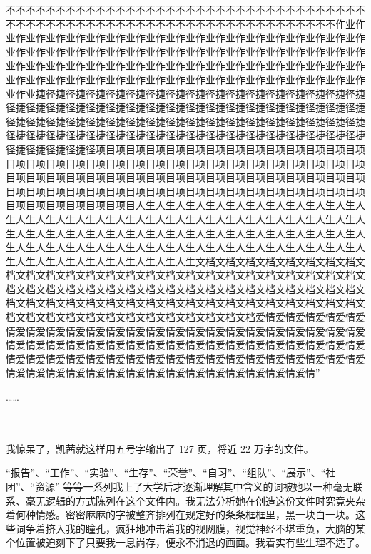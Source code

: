 \documentclass[UTF8]{ctexart}
\begin{document}
不不不不不不不不不不不不不不不不不不不不不不不不不不不不不不不不不不不不不不不不不不不不不不不不不不不不不不不不不不不不不不不不不不不不不作业作业作业作业作业作业作业作业作业作业作业作业作业作业作业作业作业作业作业作业作业作业作业作业作业作业作业作业作业作业作业作业作业作业作业作业作业作业作业作业作业作业作业作业作业作业作业作业作业作业作业作业作业作业作业作业作业作业作业作业作业作业作业作业作业作业作业作业作业作业作业作业作业作业作业捷径捷径捷径捷径捷径捷径捷径捷径捷径捷径捷径捷径捷径捷径捷径捷径捷径捷径捷径捷径捷径捷径捷径捷径捷径捷径捷径捷径捷径捷径捷径捷径捷径捷径捷径捷径捷径捷径捷径捷径捷径捷径捷径捷径捷径捷径捷径捷径捷径捷径捷径捷径捷径捷径捷径捷径捷径捷径捷径捷径捷径捷径捷径捷径捷径捷径捷径捷径捷径捷径捷径捷径捷径捷径捷径项目项目项目项目项目项目项目项目项目项目项目项目项目项目项目项目项目项目项目项目项目项目项目项目项目项目项目项目项目项目项目项目项目项目项目项目项目项目项目项目项目项目项目项目项目项目项目项目项目项目项目项目项目项目项目项目项目项目项目项目项目项目项目项目项目项目项目项目项目项目项目项目项目项目人生人生人生人生人生人生人生人生人生人生人生人生人生人生人生人生人生人生人生人生人生人生人生人生人生人生人生人生人生人生人生人生人生人生人生人生人生人生人生人生人生人生人生人生人生人生人生人生人生人生人生人生人生人生人生人生人生人生人生人生人生人生人生人生人生人生人生人生人生人生人生人生人生人生人生文档文档文档文档文档文档文档文档文档文档文档文档文档文档文档文档文档文档文档文档文档文档文档文档文档文档文档文档文档文档文档文档文档文档文档文档文档文档文档文档文档文档文档文档文档文档文档文档文档文档文档文档文档文档文档文档文档文档文档文档文档文档文档文档文档文档文档文档文档文档文档文档文档文档文档爱情爱情爱情爱情爱情爱情爱情爱情爱情爱情爱情爱情爱情爱情爱情爱情爱情爱情爱情爱情爱情爱情爱情爱情爱情爱情爱情爱情爱情爱情爱情爱情爱情爱情爱情爱情爱情爱情爱情爱情爱情爱情爱情爱情爱情爱情爱情爱情爱情爱情爱情爱情爱情爱情爱情爱情爱情爱情爱情爱情爱情爱情爱情爱情爱情爱情爱情爱情爱情爱情爱情爱情爱情爱情爱情”

……

~\\
~\\

我惊呆了，凯茜就这样用五号字输出了 127 页，将近 22 万字的文件。

“报告”、“工作”、“实验”、“生存”、“荣誉”、“自习”、“组队”、“展示”、“社团”、“资源” 等等一系列我上了大学后才逐渐理解其中含义的词被她以一种毫无联系、毫无逻辑的方式陈列在这个文件内。我无法分析她在创造这份文件时究竟夹杂着何种情感。密密麻麻的字被整齐排列在规定好的条条框框里，黑一块白一块。这些词争着挤入我的瞳孔，疯狂地冲击着我的视网膜，视觉神经不堪重负，大脑的某个位置被迫刻下了只要我一息尚存，便永不消退的画面。我着实有些生理不适了。
\end{document}
